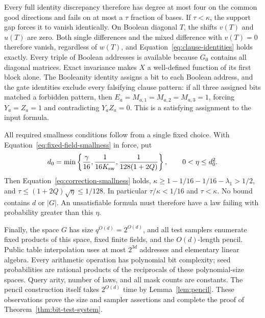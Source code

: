 Every full identity discrepancy therefore has degree at most four
on the common good directions and fails on at most a $\tau$ fraction
of bases. If $\tau<\kappa$, the support gap forces it to vanish
identically. On Boolean diagonal $T$, the shifts $v(T)$ and $u(T)$
are zero. Both single differences and the mixed difference with
$v(T)=0$ therefore vanish, regardless of $w(T)$, and
Equation~\ref{eq:clause-identities} holds exactly.
Every triple of Boolean addresses is available because $G_0$
contains all diagonal matrices. Exact invariance makes $X$ a
well-defined function of its first block alone. The Booleanity
identity assigns a bit to each Boolean address, and the gate
identities exclude every falsifying clause pattern: if all three
assigned bits matched a forbidden pattern, then $E_a=M_{a,1}
=M_{a,2}=M_{a,3}=1$, forcing $Y_a=Z_a=1$ and contradicting
$Y_aZ_a=0$. This is a satisfying assignment to the input formula.

All required smallness conditions follow from a single fixed choice.
With Equation~\ref{eq:fixed-field-smallness} in force, put
\[
 d_0=\min\left\{\frac{\gamma}{16},
          \frac1{16K_{\rm sw}},\frac1{128(1+2Q)}\right\},
 \qquad 0<\eta\leq d_0^2.
\]
Then Equation~\ref{eq:correction-smallness} holds,
$\kappa\geq1-1/16-1/16-\lambda_1>1/2$, and
$\tau\leq(1+2Q)\sqrt\eta\leq1/128$.
In particular $\tau/\kappa<1/16$ and $\tau<\kappa$.
No bound contains $d$ or $|G|$. An unsatisfiable formula must
therefore have a law failing with probability greater than this
$\eta$.

Finally, the space $G$ has size $q^{O(d)}=2^{O(d)}$, and all
test samplers enumerate fixed products of this space, fixed finite
fields, and the $O(d)$-length pencil. Public table interpolation
uses at most $2^{3d}$ addresses and elementary linear algebra.
Every arithmetic operation has polynomial bit complexity; seed
probabilities are rational products of the reciprocals of these
polynomial-size spaces. Query arity, number of laws, and all mask
counts are constants. The pencil construction itself takes
$2^{O(d)}$ time by Lemma~\ref{lem:pencil}.
These observations prove the size and sampler assertions and
complete the proof of Theorem~\ref{thm:bit-test-system}.
